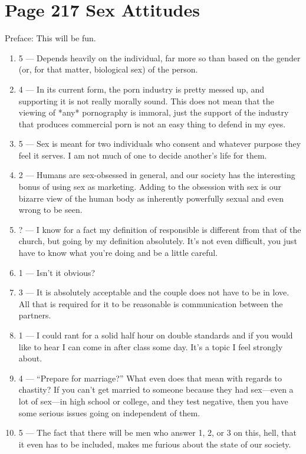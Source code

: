 \documentclass[11pt]{article}
\begin{document}
\section{Page 217 Sex Attitudes}
Preface: This will be fun.
\begin{enumerate}
	\item 5 --- Depends heavily on the individual, far more so than based on the
		gender (or, for that matter, biological sex) of the person.
	\item 4 --- In its current form, the porn industry is pretty messed up, and
		supporting it is not really morally sound.  This does not mean that the 
		viewing of *any* pornography is immoral, just the support of the industry
		that produces commercial porn is not an easy thing to defend in my eyes.
	\item 5 --- Sex is meant for two individuals who consent and whatever purpose
		they feel it serves.  I am not much of one to decide another's life for
		them.
	\item 2 --- Humans are sex-obsessed in general, and our society has the
		interesting bonus of using sex as marketing.  Adding to the obsession with 
		sex is our bizarre view of the human body as inherently powerfully sexual
		and even wrong to be seen.
	\item ? --- I know for a fact my definition of responsible is different from
		that of the church, but going by my definition absolutely.  It's not even
		difficult, you just have to know what you're doing and be a little careful.
	\item 1 --- Isn't it obvious?
	\item 3 --- It is absolutely acceptable and the couple does not have to be 
		in love.  All that is required for it to be reasonable is communication
		between the partners.
	\item 1 --- I could rant for a solid half hour on double standards and if you
		would like to hear I can come in after class some day.  It's a topic I feel 
		strongly about.
	\item 4 --- ``Prepare for marriage?'' What even does that mean with regards 
		to chastity?  If you can't get married to someone because they had 
		sex---even a lot of sex---in high school or college, and they test negative,
		then you have some serious issues going on independent of them.
	\item 5 --- The fact that there will be men who answer 1, 2, or 3 on this,
		hell, that it even has to be included, makes me furious about the state of
		our society.

\end{enumerate}
\end{document}
